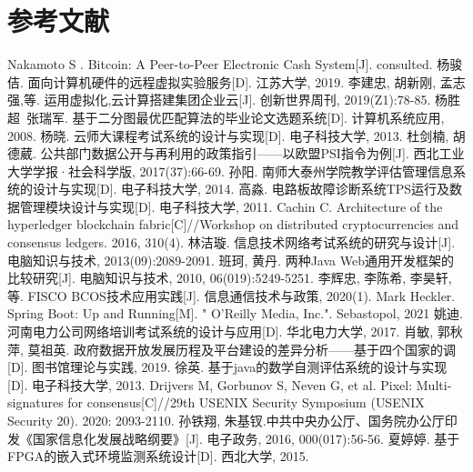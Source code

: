 \section*{参考文献}

\begingroup
\def\section*#1{}

\begin{thebibliography}{99}

Nakamoto S . Bitcoin: A Peer-to-Peer Electronic Cash System[J]. consulted.
杨骏佶. 面向计算机硬件的远程虚拟实验服务[D]. 江苏大学, 2019.
李建忠, 胡新刚, 孟志强,等. 运用虚拟化,云计算搭建集团企业云[J]. 创新世界周刊, 2019(Z1):78-85.
杨胜超~张瑞军. 基于二分图最优匹配算法的毕业论文选题系统[D]. 计算机系统应用, 2008.
杨晓. 云师大课程考试系统的设计与实现[D]. 电子科技大学, 2013.
杜剑楠, 胡德葳. 公共部门数据公开与再利用的政策指引——以欧盟PSI指令为例[J]. 西北工业大学学报·社会科学版, 2017(37):66-69.
孙阳. 南师大泰州学院教学评估管理信息系统的设计与实现[D]. 电子科技大学, 2014.
高淼. 电路板故障诊断系统TPS运行及数据管理模块设计与实现[D]. 电子科技大学, 2011.
Cachin C. Architecture of the hyperledger blockchain fabric[C]//Workshop on distributed cryptocurrencies and consensus ledgers. 2016, 310(4).
林洁璇. 信息技术网络考试系统的研究与设计[J]. 电脑知识与技术, 2013(09):2089-2091.
班珂, 黄丹. 两种Java Web通用开发框架的比较研究[J]. 电脑知识与技术, 2010, 06(019):5249-5251.
李辉忠, 李陈希, 李昊轩,等. FISCO BCOS技术应用实践[J]. 信息通信技术与政策, 2020(1).
Mark Heckler. Spring Boot: Up and Running[M]. " O'Reilly Media, Inc.". Sebastopol, 2021
姚迪. 河南电力公司网络培训考试系统的设计与应用[D]. 华北电力大学, 2017.
肖敏, 郭秋萍, 莫祖英. 政府数据开放发展历程及平台建设的差异分析——基于四个国家的调[D]. 图书馆理论与实践, 2019.
徐英. 基于java的数学自测评估系统的设计与实现[D]. 电子科技大学, 2013.
Drijvers M, Gorbunov S, Neven G, et al. Pixel: Multi-signatures for consensus[C]//29th {USENIX} Security Symposium ({USENIX} Security 20). 2020: 2093-2110.
孙铁翔, 朱基钗.中共中央办公厅、国务院办公厅印发《国家信息化发展战略纲要》[J]. 电子政务, 2016, 000(017):56-56.
夏婷婷. 基于FPGA的嵌入式环境监测系统设计[D]. 西北大学, 2015.

\end{thebibliography}
